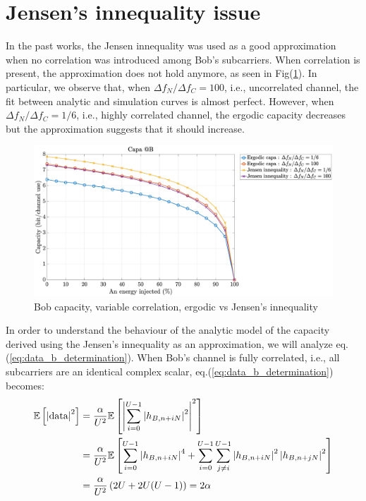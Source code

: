 \documentclass[12pt]{article}
\begin{document}
\section{Jensen's innequality issue}
In the past works, the Jensen innequality was used as a good approximation when no correlation was introduced among Bob's subcarriers. When correlation is present, the approximation does not hold anymore, as seen in Fig(\ref{fig:capaB_ergo_jensen}). In particular, we observe that, when $\Delta f_N / \Delta f_C = 100$, i.e., uncorrelated channel, the fit between analytic and simulation curves is almost perfect. However, when $\Delta f_N / \Delta f_C = 1/6$, i.e., highly correlated channel, the ergodic capacity decreases but the approximation suggests that it should increase. 
\begin{figure}[htb!]
	\centering
	\includegraphics[width=.75\linewidth]{img/capaB_ergoVSjensen.eps}
	\caption{Bob capacity, variable correlation, ergodic vs Jensen's innequality}
	\label{fig:capaB_ergo_jensen}
\end{figure} 
In order to understand the behaviour of the analytic model of the capacity derived using the Jensen's innequality as an approximation, we will analyze eq.(\ref{eq:data_b_determination}). When Bob's channel is fully correlated, i.e., all subcarriers are an identical complex scalar, eq.(\ref{eq:data_b_determination}) becomes:
\begin{equation}
\begin{split}
\mathbb{E} \left[\left| \text{data}\right|^2\right] &=  \frac{\alpha}{U^2} \mathbb{E} \left[\left|\sum_{i=0}^{U-1} \left|h_{B,n+iN}\right|^2\right|^2\right] \\
&=  \frac{\alpha}{U^2} \mathbb{E} \left[\sum_{i=0}^{U-1} \left|h_{B,n+iN}\right|^4  + \sum_{i=0}^{U-1}\sum_{j \neq i}^{U-1} \left|h_{B,n+iN}\right|^2  \left|h_{B,n+jN}\right|^2 \right] \\
&=  \frac{\alpha}{U^2} \left(2U + 2U(U-1) \right)= 2\alpha
\label{eq:data_b_determination_fullCorrel}
\end{split}
\end{equation}
\end{document}
